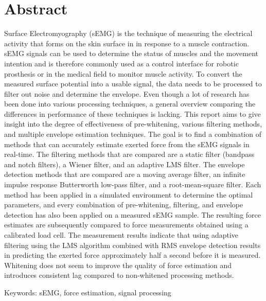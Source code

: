 \chapter*{Abstract}

Surface Electromyography (sEMG) is the technique of measuring the electrical activity that forms on the skin surface in in response to a muscle contraction. sEMG signals can be used to determine the status of muscles and the movement intention and is therefore commonly used as a control interface for robotic prosthesis or in the medical field to monitor muscle activity. To convert the measured surface potential into a usable signal, the data needs to be processed to filter out noise and determine the envelope. Even though a lot of research has been done into various processing techniques, a general overview comparing the differences in performance of these techniques is lacking. This report aims to give insight into the degree of effectiveness of pre-whitening, various filtering methods, and multiple envelope estimation techniques. The goal is to find a combination of methods that can accurately estimate exerted force from the sEMG signals in real-time. The filtering methods that are compared are a static filter (bandpass and notch filters), a Wiener filter, and an adaptive LMS filter. The envelope detection methods that are compared are a moving average filter, an infinite impulse response Butterworth low-pass filter, and a root-mean-square filter. Each method has been applied in a simulated environment to determine the optimal parameters, and every combination of pre-whitening, filtering, and envelope detection has also been applied on a measured sEMG sample. The resulting force estimates are subsequently compared to force measurements obtained using a calibrated load cell. The measurement results indicate that using adaptive filtering using the LMS algorithm combined with RMS envelope detection results in predicting the exerted force approximately half a second before it is measured. Whitening does not seem to improve the quality of force estimation and introduces consistent lag compared to non-whitened processing methods.

Keywords: sEMG, force estimation, signal processing
